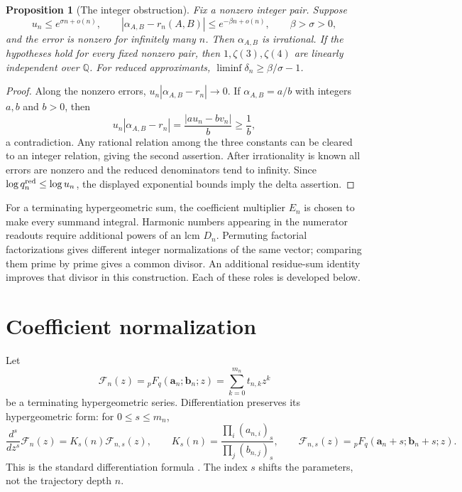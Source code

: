 \documentclass[11pt]{article}
\newcommand{\F}{\mathcal F}
\newcommand{\Q}{\mathbb Q}
\newtheorem{proposition}{Proposition}
\begin{document}
\begin{proposition}[The integer obstruction]\label{conceptual-criterion}
Fix a nonzero integer pair. Suppose
\[
 u_n\leq e^{\sigma n+o(n)},\qquad
 |\alpha_{A,B}-r_n(A,B)|\leq e^{-\beta n+o(n)},
 \qquad\beta>\sigma>0,
\]
and the error is nonzero for infinitely many $n$. Then
$\alpha_{A,B}$ is irrational. If the hypotheses hold for every fixed
nonzero pair, then $1,\zeta(3),\zeta(4)$ are linearly independent over
$\Q$. For reduced approximants, $\liminf\delta_n\geq\beta/\sigma-1$.
\end{proposition}
\begin{proof}
Along the nonzero errors, $u_n|\alpha_{A,B}-r_n|\to0$.
If $\alpha_{A,B}=a/b$ with integers $a,b$ and $b>0$, then
\[
 u_n|\alpha_{A,B}-r_n|
 =\frac{|au_n-bv_n|}{b}\geq\frac1b,
\]
a contradiction. Any rational relation among the three constants can
be cleared to an integer relation, giving the second assertion.
After irrationality is known all errors are nonzero and the reduced
denominators tend to infinity. Since $\log q_n^{\rm red}\leq\log u_n$,
the displayed exponential bounds imply the delta assertion.
\end{proof}

For a terminating hypergeometric sum, the coefficient multiplier $E_n$
is chosen to make every summand integral. Harmonic numbers appearing
in the numerator readouts require additional powers of an lcm $D_n$.
Permuting factorial factorizations gives different integer
normalizations of the same vector; comparing them prime by prime gives
a common divisor. An additional residue-sum identity improves that
divisor in this construction. Each of these roles is developed below.

\section{Coefficient normalization}
Let
\[
 \F_n(z)={}_pF_q(\mathbf a_n;\mathbf b_n;z)
       =\sum_{k=0}^{m_n}t_{n,k}z^k
\]
be a terminating hypergeometric series. Differentiation preserves its
hypergeometric form: for $0\leq s\leq m_n$,
\begin{equation}\label{differentiation}
 \frac{d^s}{dz^s}\F_n(z)
 =K_s(n)\F_{n,s}(z),\qquad
 K_s(n)=\frac{\prod_i(a_{n,i})_s}{\prod_j(b_{n,j})_s},\qquad
 \F_{n,s}(z)={}_pF_q(\mathbf a_n+s;\mathbf b_n+s;z).
\end{equation}
This is the standard differentiation formula
\cite[Eq.~16.3.1]{DLMF}. The index $s$ shifts the parameters, not the
trajectory depth $n$.
\end{document}
